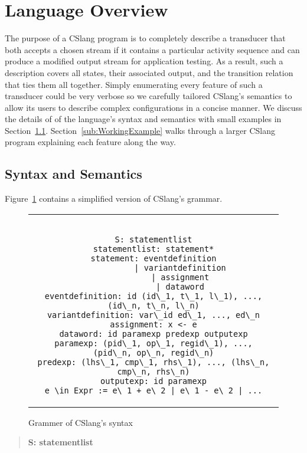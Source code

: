 \section{Language Overview}
\label{sec:Overview}

The purpose
of a CSlang program is to completely describe a transducer that both
accepts a chosen stream if it contains a particular
activity sequence and can produce a modified
output stream
for application testing.  As a result, such a
description covers all states, their associated output, and the transition
relation that ties them all together.
Simply enumerating every feature of such a transducer could be very verbose
so we carefully tailored CSlang's semantics to allow its users to
describe complex configurations in a concise manner.
We discuss the details of of the
language's syntax and semantics with small examples in
Section~\ref{sub:SyntaxAndSemantics}.  Section~\ref{sub:WorkingExample} walks through a
larger CSlang program explaining each feature along the way.

\subsection{Syntax and Semantics}
\label{sub:SyntaxAndSemantics}

Figure~\ref{lst:SyntaxGrammar} contains a simplified
version of CSlang's grammar.

\begin{figure}[H]
\centering
\begin{tabular}{c}
\begin{lstlisting}

S: statementlist
statementlist: statement*
statement: eventdefinition
           | variantdefinition
           | assignment
           | dataword
eventdefinition: id (id\_1, t\_1, l\_1), ..., (id\_n, t\_n, l\_n)
variantdefinition: var\_id ed\_1, ..., ed\_n
assignment: x <- e
dataword: id paramexp predexp outputexp
paramexp: (pid\_1, op\_1, regid\_1), ..., (pid\_n, op\_n, regid\_n)
predexp: (lhs\_1, cmp\_1, rhs\_1), ..., (lhs\_n, cmp\_n, rhs\_n)
outputexp: id paramexp
e \in Expr := e\_1 + e\_2 | e\_1 - e\_2 | ...
\end{lstlisting}
\end{tabular}
\caption{Grammer of CSlang's syntax}
\label{lst:SyntaxGrammar}
\end{figure}


\begin{quote}
\centering
\textbf{S: statementlist}
\end{quote}

